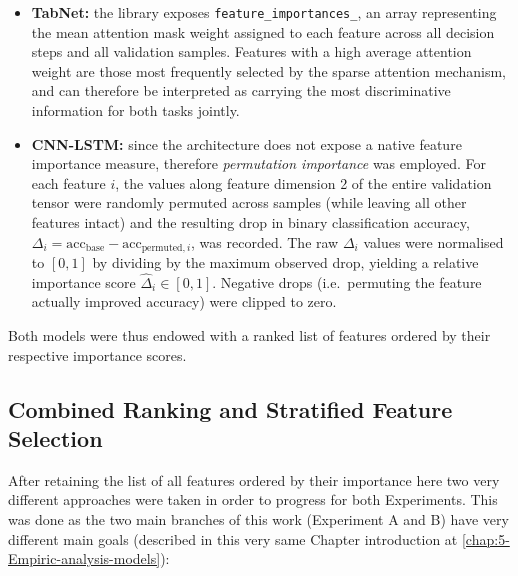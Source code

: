 \documentclass[../main.tex]{subfiles}
\begin{document}
\begin{itemize}
    \item \textbf{TabNet:} the library exposes \texttt{feature\_importances\_}, an array representing the mean attention mask weight assigned to each feature across all decision steps and all validation samples.  Features with a high average attention weight are those most frequently selected by the sparse attention mechanism, and can therefore be interpreted as carrying the most discriminative information for both tasks jointly.
    \item \textbf{CNN-LSTM:} since the architecture does not expose a native feature importance measure, therefore \emph{permutation importance} was employed.  For each feature $i$, the values along feature dimension 2 of the entire validation tensor were randomly permuted across samples (while leaving all other features intact) and the resulting drop in binary classification accuracy, $\Delta_i = \mathrm{acc}_{\text{base}} - \mathrm{acc}_{\text{permuted},i}$, was recorded.  The raw $\Delta_i$ values were normalised to $[0, 1]$ by dividing by the maximum observed drop, yielding a relative importance score $\hat{\Delta}_i \in [0, 1]$.  Negative drops (i.e.\ permuting the feature actually improved accuracy) were clipped to zero.
\end{itemize}

Both models were thus endowed with a ranked list of features ordered by their respective importance scores.

\newpage
\subsection{Combined Ranking and Stratified Feature Selection}
\label{sec:combined-ranking}

After retaining the list of all features ordered by their importance here two very different approaches were taken in order to progress for both Experiments. This was done as the two main branches of this work (Experiment A and B) have very different main goals (described in this very same Chapter introduction at \ref{chap:5-Empiric-analysis-models}):
\end{document}
